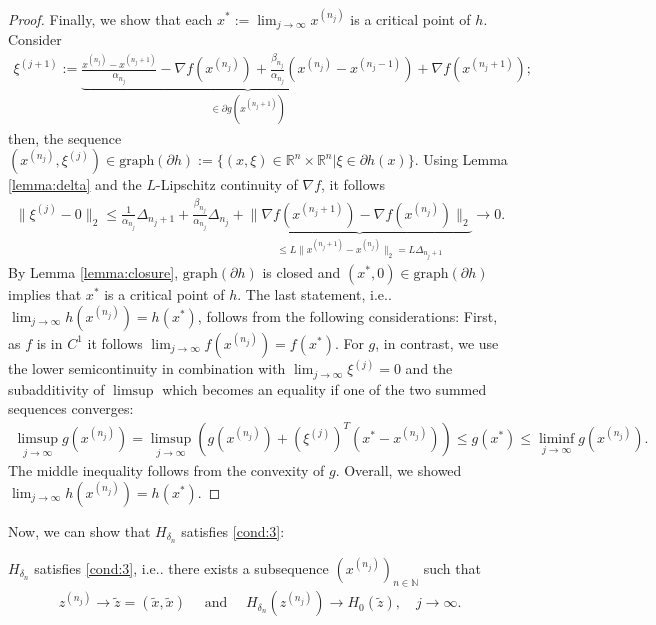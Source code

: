 \documentclass[onecolumn,final,a4paper,13pt,reqno]{siamart}
\makeatletter
\DeclareRobustCommand\onedot{\futurelet\@let@token\@onedot}
\def\@onedot{\ifx\@let@token.\else.\null\fi\xspace}
\def\ie{{i.e}\onedot} \def\Ie{{I.e}\onedot}
\makeatother
\begin{document}
\begin{proof}
	Finally, we show that each $x^\ast := \lim_{j \rightarrow \infty} x^{(n_j)}$ is a critical point of $h$. Consider
	\begin{align}
		\xi^{(j + 1)} := \underbrace{\frac{x^{(n_j)} - x^{(n_j + 1)}}{\alpha_{n_j}} - \nabla f(x^{(n_j)}) + \frac{\beta_{n_j}}{\alpha_{n_j}} (x^{(n_j)} - x^{(n_j - 1)})}_{\in \partial g(x^{(n_j + 1)})} + \nabla f(x^{(n_j + 1)});
	\end{align}
	then, the sequence $(x^{(n_j)}, \xi^{(j)}) \in \text{graph}(\partial h) := \{(x, \xi) \in \mathbb{R}^n \times \mathbb{R}^n | \xi \in \partial h(x)\}$. Using Lemma \ref{lemma:delta} and the $L$-Lipschitz continuity of $\nabla f$, it follows
	\begin{align}
		\|\xi^{(j)} - 0\|_2 \leq \frac{1}{\alpha_{n_j}} \Delta_{n_j + 1} + \frac{\beta_{n_j}}{\alpha_{n_j}}\Delta_{n_j} + \underbrace{\|\nabla f(x^{(n_j + 1)}) - \nabla f(x^{(n_j)})\|_2}_{\leq L\|x^{(n_j + 1)} - x^{(n_j)}\|_2 = L\Delta_{n_j + 1}} \rightarrow 0.
	\end{align}
	By Lemma \ref{lemma:closure}, $\text{graph}(\partial h)$ is closed and $(x^\ast, 0) \in \text{graph}(\partial h)$ implies that $x^\ast$ is a critical point of $h$. The last statement, \ie $\lim_{j \rightarrow \infty} h(x^{(n_j)}) = h(x^\ast)$, follows from the following considerations: First, as $f$ is in $C^1$ it follows $\lim_{j \rightarrow \infty} f(x^{(n_j)}) = f(x^\ast)$. For $g$, in contrast, we use the lower semicontinuity in combination with $\lim_{j \rightarrow \infty} \xi^{(j)} = 0$ and the subadditivity of $\limsup$ which becomes an equality if one of the two summed sequences converges:
	\begin{align}
		\limsup_{j \rightarrow \infty} g(x^{(n_j)}) = \limsup_{j \rightarrow \infty} \left(g(x^{(n_j)}) + (\xi^{(j)})^T(x^\ast - x^{(n_j)}) \right)\leq g(x^\ast) \leq \liminf_{j \rightarrow \infty} g(x^{(n_j)}).
	\end{align}
	The middle inequality follows from the convexity of $g$. Overall, we showed $\lim_{j \rightarrow \infty} h(x^{(n_j)}) = h(x^\ast)$.
\end{proof}

Now, we can show that $H_{\delta_n}$ satisfies \ref{cond:3}:

\begin{lemmamd}
	$H_{\delta_n}$ satisfies \ref{cond:3}, \ie there exists a subsequence $(x^{(n_j)})_{n \in \mathbb{N}}$ such that
	\begin{align}
		z^{(n_j)} \rightarrow \tilde{z} = (\tilde{x}, \tilde{x})\quad\text{ and }\quad H_{\delta_n}(z^{(n_j)}) \rightarrow H_0(\tilde{z}),\quad j \rightarrow \infty.
	\end{align}
\end{lemmamd}
\end{document}
